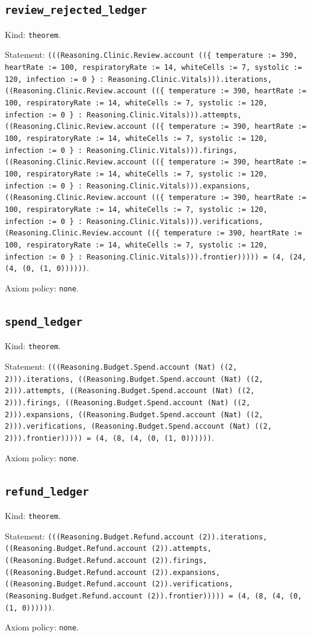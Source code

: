 \documentclass[11pt]{article}
\begin{document}
\subsection*{\texttt{review\_rejected\_ledger}}
\noindent Kind: \texttt{theorem}.\par
\noindent Statement: \texttt{(((Reasoning.Clinic.Review.account ((\{ temperature := 390, heartRate := 100, respiratoryRate := 14, whiteCells := 7, systolic := 120, infection := 0 \} : Reasoning.Clinic.Vitals))).iterations, ((Reasoning.Clinic.Review.account ((\{ temperature := 390, heartRate := 100, respiratoryRate := 14, whiteCells := 7, systolic := 120, infection := 0 \} : Reasoning.Clinic.Vitals))).attempts, ((Reasoning.Clinic.Review.account ((\{ temperature := 390, heartRate := 100, respiratoryRate := 14, whiteCells := 7, systolic := 120, infection := 0 \} : Reasoning.Clinic.Vitals))).firings, ((Reasoning.Clinic.Review.account ((\{ temperature := 390, heartRate := 100, respiratoryRate := 14, whiteCells := 7, systolic := 120, infection := 0 \} : Reasoning.Clinic.Vitals))).expansions, ((Reasoning.Clinic.Review.account ((\{ temperature := 390, heartRate := 100, respiratoryRate := 14, whiteCells := 7, systolic := 120, infection := 0 \} : Reasoning.Clinic.Vitals))).verifications, (Reasoning.Clinic.Review.account ((\{ temperature := 390, heartRate := 100, respiratoryRate := 14, whiteCells := 7, systolic := 120, infection := 0 \} : Reasoning.Clinic.Vitals))).frontier))))) = (4, (24, (4, (0, (1, 0))))))}.\par
\noindent Axiom policy: \texttt{none}.\par
\subsection*{\texttt{spend\_ledger}}
\noindent Kind: \texttt{theorem}.\par
\noindent Statement: \texttt{(((Reasoning.Budget.Spend.account (Nat) ((2, 2))).iterations, ((Reasoning.Budget.Spend.account (Nat) ((2, 2))).attempts, ((Reasoning.Budget.Spend.account (Nat) ((2, 2))).firings, ((Reasoning.Budget.Spend.account (Nat) ((2, 2))).expansions, ((Reasoning.Budget.Spend.account (Nat) ((2, 2))).verifications, (Reasoning.Budget.Spend.account (Nat) ((2, 2))).frontier))))) = (4, (8, (4, (0, (1, 0))))))}.\par
\noindent Axiom policy: \texttt{none}.\par
\subsection*{\texttt{refund\_ledger}}
\noindent Kind: \texttt{theorem}.\par
\noindent Statement: \texttt{(((Reasoning.Budget.Refund.account (2)).iterations, ((Reasoning.Budget.Refund.account (2)).attempts, ((Reasoning.Budget.Refund.account (2)).firings, ((Reasoning.Budget.Refund.account (2)).expansions, ((Reasoning.Budget.Refund.account (2)).verifications, (Reasoning.Budget.Refund.account (2)).frontier))))) = (4, (8, (4, (0, (1, 0))))))}.\par
\noindent Axiom policy: \texttt{none}.\par
\end{document}
